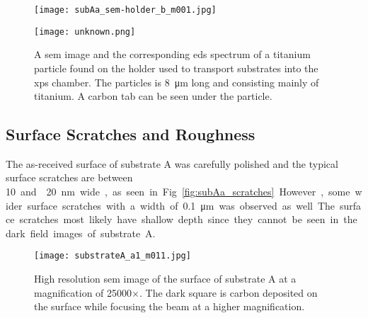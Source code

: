 \begin{figure}[htbp]
    \centering
      \begin{minipage}[t]{0.49\linewidth}
        \centering
        \texttt{[image: subAa\_sem-holder\_b\_m001.jpg]}
      \end{minipage}
      \begin{minipage}[t]{0.49\linewidth}
        \centering
        \texttt{[image: unknown.png]}
      \end{minipage}
    \caption[\Ac{sem} image and corresponding \ac{eds} spectrum of titanium particle.]{A \ac{sem} image and the corresponding \ac{eds} spectrum of a titanium particle found on the holder used to transport substrates into the \ac{xps} chamber. The particles is \SI{8}{\micro\metre} long and consisting mainly of titanium. A carbon tab can be seen under the particle.}
    \label{fig:subAa_titanium}%
\end{figure}


\subsection{Surface Scratches and Roughness}
The as-received surface of substrate A was carefully polished and the typical surface scratches are between \SI{10} and {}\SI{20}{\nano\metre} wide, as seen in Fig.~\ref{fig:subAa_scratches}. However, some wider surface scratches with a width of \SI{0.1}{\micro\metre} was observed as well. The surface scratches most likely have shallow depth since they cannot be seen in the dark field images of substrate A.

\begin{figure}[htbp]
    \centering
    \texttt{[image: substrateA\_a1\_m011.jpg]}
    \caption[\Ac{sem} image of surface scratches on substrate A.]{High resolution \acf{sem} image of the surface of substrate A at a magnification of 25000$\times$. The dark square is carbon deposited on the surface while focusing the beam at a higher magnification.}\label{fig:subAa_scratches}
    \label{fig:SEM_A_surface}
\end{figure}

